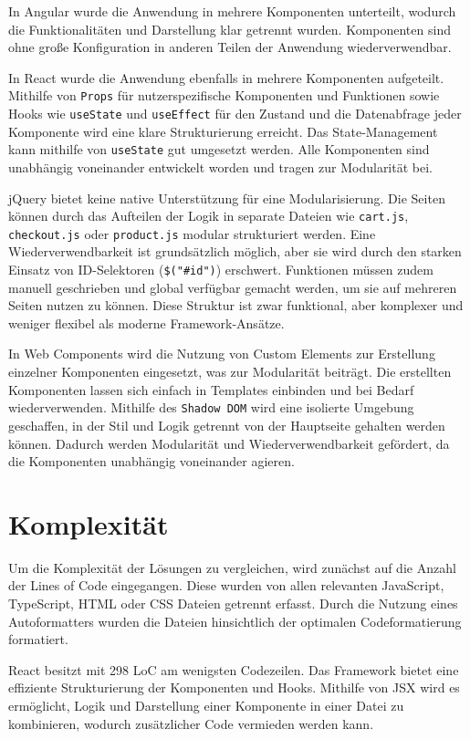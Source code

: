 \documentclass[oneside]{ausarbeitung}
\begin{document}
In Angular wurde die Anwendung in mehrere Komponenten unterteilt, wodurch die Funktionalitäten und Darstellung klar getrennt wurden. Komponenten sind ohne große Konfiguration in anderen Teilen der Anwendung wiederverwendbar.  

In React wurde die Anwendung ebenfalls in mehrere Komponenten aufgeteilt. Mithilfe von \texttt{Props} für nutzerspezifische Komponenten und Funktionen sowie Hooks wie \texttt{useState} und \texttt{useEffect} für den Zustand und die Datenabfrage jeder Komponente wird eine klare Strukturierung erreicht. Das State-Management kann mithilfe von \texttt{useState} gut umgesetzt werden. Alle Komponenten sind unabhängig voneinander entwickelt worden und tragen zur Modularität bei.  

jQuery bietet keine native Unterstützung für eine Modularisierung. Die Seiten können durch das Aufteilen der Logik in separate Dateien wie \texttt{cart.js}, \texttt{checkout.js} oder \texttt{product.js} modular strukturiert werden. Eine Wiederverwendbarkeit ist grundsätzlich möglich, aber sie wird durch den starken Einsatz von ID-Selektoren (\texttt{\$("\#id")}) erschwert. Funktionen müssen zudem manuell geschrieben und global verfügbar gemacht werden, um sie auf mehreren Seiten nutzen zu können. Diese Struktur ist zwar funktional, aber komplexer und weniger flexibel als moderne Framework-Ansätze.

In Web Components wird die Nutzung von Custom Elements zur Erstellung einzelner Komponenten eingesetzt, was zur Modularität beiträgt. Die erstellten Komponenten lassen sich einfach in Templates einbinden und bei Bedarf wiederverwenden. Mithilfe des \texttt{Shadow DOM} wird eine isolierte Umgebung geschaffen, in der Stil und Logik getrennt von der Hauptseite gehalten werden können. Dadurch werden Modularität und Wiederverwendbarkeit gefördert, da die Komponenten unabhängig voneinander agieren.

\section{Komplexität}

Um die Komplexität der Lösungen zu vergleichen, wird zunächst auf die Anzahl der Lines of Code eingegangen. Diese wurden von allen relevanten JavaScript, TypeScript, \ac{HTML} oder \ac{CSS} Dateien getrennt erfasst. Durch die Nutzung eines Autoformatters wurden die Dateien hinsichtlich der optimalen Codeformatierung formatiert. 

React besitzt mit 298 \ac{LoC} am wenigsten Codezeilen. Das Framework bietet eine effiziente Strukturierung der Komponenten und Hooks. Mithilfe von \ac{JSX} wird es ermöglicht, Logik und Darstellung einer Komponente in einer Datei zu kombinieren, wodurch zusätzlicher Code vermieden werden kann. 
\end{document}
